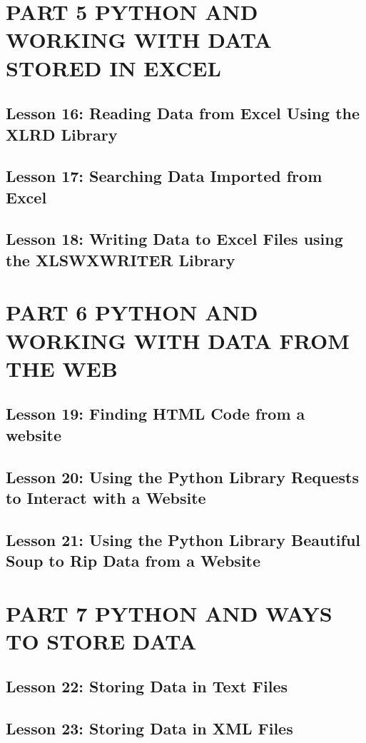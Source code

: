 \documentclass[11pt]{article}
\begin{document}
\section{PART 5 PYTHON AND WORKING WITH DATA STORED IN EXCEL}
\label{sec:org87b773d}
\subsection{Lesson 16: Reading Data from Excel Using the XLRD Library}
\label{sec:org25bbac4}
\subsection{Lesson 17: Searching Data Imported from Excel}
\label{sec:org6ed2cbe}
\subsection{Lesson 18: Writing Data to Excel Files using the XLSWXWRITER Library}
\label{sec:orge5c126e}
\section{PART 6 PYTHON AND WORKING WITH DATA FROM THE WEB}
\label{sec:orga9c4658}
\subsection{Lesson 19: Finding HTML Code from a website}
\label{sec:org35d098a}
\subsection{Lesson 20: Using the Python Library Requests to Interact with a Website}
\label{sec:org1a053f0}
\subsection{Lesson 21: Using the Python Library Beautiful Soup to Rip Data from a Website}
\label{sec:org2d9e8f4}
\section{PART 7 PYTHON AND WAYS TO STORE DATA}
\label{sec:org99b38b1}
\subsection{Lesson 22: Storing Data in Text Files}
\label{sec:org00e1949}
\subsection{Lesson 23: Storing Data in XML Files}
\label{sec:orgc83ee79}
\end{document}
